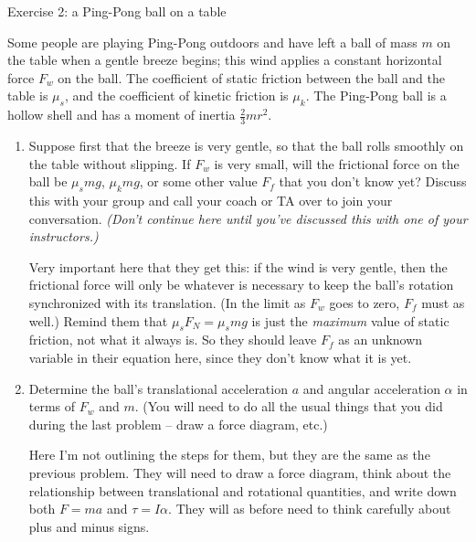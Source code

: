 \documentclass[12pt]{article}
\begin{document}
\begin{center}
	\large Exercise 2: a Ping-Pong ball on a table
\end{center}

Some people are playing Ping-Pong outdoors and have left a ball of mass $m$ on the table when a gentle breeze begins; this wind applies a constant horizontal force $F_w$ on the ball. The coefficient of static friction between the ball and the table is $\mu_s$, and the coefficient of kinetic friction is $\mu_k$. The Ping-Pong ball is a hollow shell and has a moment of inertia $\frac{2}{3}mr^2$.

\begin{enumerate}

\item Suppose first that the breeze is very gentle, so that the ball rolls smoothly on the table without slipping. If $F_w$ is very small, will the frictional force on the ball be $\mu_s mg$, $\mu_k mg$, or some other value $F_f$ that you don't know yet? Discuss this with your group and call your coach or TA over to join your conversation. {\it (Don't continue here until you've discussed this with one of your instructors.)}

{\color{red}Very important here that they get this: if the wind is very gentle, then the frictional force will only be whatever is necessary to keep the ball's rotation synchronized with its translation. (In the limit as $F_w$ goes to zero, $F_f$ must as well.) Remind them that $\mu_s F_N = \mu_s mg$ is just the {\it maximum} value of static friction, not what it always is. So they should leave $F_f$ as an unknown variable in their equation here, since they don't know what it is yet.}

\bigskip

\item Determine the ball's translational acceleration $a$ and angular acceleration $\alpha$ in terms of $F_w$ and $m$. (You will need to do all the usual things that you did during the last problem -- draw a force diagram, etc.)

{\color{blue}
	
	Here I'm not outlining the steps for them, but they are the same as the previous problem. They will need to draw a force diagram, think about the relationship between translational and rotational quantities, and write down both $F=ma$ and $\tau = I \alpha$. They will as before need to think carefully about plus and minus signs.}

{\color{red}
	
}
\end{enumerate}
\end{document}
